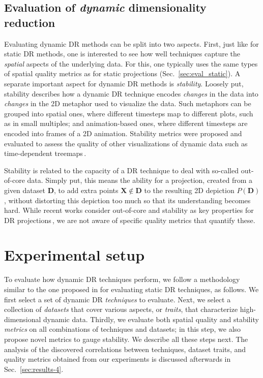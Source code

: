 \subsection{Evaluation of \textit{dynamic} dimensionality reduction}
\label{sec:eval_dynamic}
%
Evaluating dynamic DR methods can be split into two aspects. First, just like for static DR methods, one is interested to see how well techniques capture the \emph{spatial} aspects of the underlying data. For this, one typically uses the same types of spatial quality metrics as for static projections (Sec.~\ref{sec:eval_static}). A separate important aspect for dynamic DR methods is \emph{stability}. Loosely put, stability describes how a dynamic DR technique encodes \emph{changes} in the data into \emph{changes} in the 2D metaphor used to visualize the data. Such metaphors can be grouped into spatial ones, where different timesteps map to different plots, such as in small multiples; and animation-based ones, where different timesteps are encoded into frames of a 2D animation.
Stability metrics were proposed and evaluated to assess the quality of other visualizations of dynamic data such as time-dependent treemaps\,\citep{sondag17,vernier18git,vernier18software}.

Stability is related to the capacity of a DR technique to deal with so-called out-of-core data. Simply put, this means the ability for a projection, created from a given dataset $\mathbf{D}$, to add extra points $\mathbf{X} \notin \mathbf{D}$ to the resulting 2D depiction $P(\mathbf{D})$, without distorting this depiction too much so that its understanding becomes hard. While recent works consider out-of-core and stability as key properties for DR projections\,\citep{Nonato2019,Boytsov2017,MateusEspadoto,Garcia-fernandez2013,Buja2008}, we are not aware of specific quality metrics that quantify these.


\section{Experimental setup}
\label{sec:experiment}
%
To evaluate how dynamic DR techniques perform, we follow a methodology similar to the one proposed in \cite{Espadoto19} for evaluating static DR techniques, as follows.
We first select a set of dynamic DR \emph{techniques} to evaluate. Next, we select a collection of \emph{datasets} that cover various aspects, or \emph{traits}, that characterize high-dimensional dynamic data. Thirdly, we evaluate both spatial quality and stability \emph{metrics} on all combinations of techniques and datasets; in this step, we also propose novel metrics to gauge stability. We describe all these steps next. The analysis of the discovered correlations between techniques, dataset traits, and quality metrics obtained from our experiments is discussed afterwards in Sec.~\ref{sec:results-4}.

